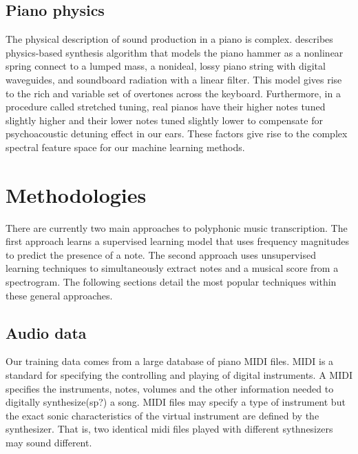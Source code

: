 \documentclass[5p]{elsarticle}
\begin{document}
\subsection{Piano physics}

The physical description of sound production in a piano is complex. \citet{bank2003physically} describes physics-based synthesis algorithm that models the piano hammer as a nonlinear spring connect to a lumped mass, a nonideal, lossy piano string with digital waveguides, and soundboard radiation with a linear filter. This model gives rise to the rich and variable set of overtones across the keyboard. Furthermore, in a procedure called stretched tuning, real pianos have their higher notes tuned slightly higher and their lower notes tuned slightly lower to compensate for psychoacoustic detuning effect in our ears. These factors give rise to the complex spectral feature space for our machine learning methods.



\section{Methodologies}
There are currently two main approaches to polyphonic music transcription. The first approach learns a supervised learning model that uses frequency magnitudes to predict the presence of a note. The second approach uses unsupervised learning techniques to simultaneously extract notes and a musical score from a spectrogram. The following sections detail the most popular techniques within these general approaches.

\subsection{Audio data}
Our training data comes from a large database of piano MIDI files. MIDI is a standard for specifying the controlling and playing of digital instruments. A MIDI specifies the instruments, notes, volumes and the other information needed to digitally synthesize(sp?) a song. MIDI files may specify a type of instrument but the exact sonic characteristics of the virtual instrument are defined by the synthesizer. That is, two identical midi files played with different sythnesizers may sound different.
\end{document}
